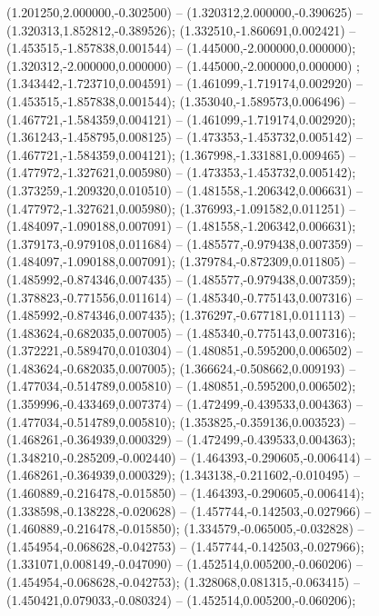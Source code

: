  (1.201250,2.000000,-0.302500) -- (1.320312,2.000000,-0.390625) -- (1.320313,1.852812,-0.389526);
 (1.332510,-1.860691,0.002421) -- (1.453515,-1.857838,0.001544) -- (1.445000,-2.000000,0.000000);
 (1.320312,-2.000000,0.000000) -- (1.445000,-2.000000,0.000000) ;
 (1.343442,-1.723710,0.004591) -- (1.461099,-1.719174,0.002920) -- (1.453515,-1.857838,0.001544);
 (1.353040,-1.589573,0.006496) -- (1.467721,-1.584359,0.004121) -- (1.461099,-1.719174,0.002920);
 (1.361243,-1.458795,0.008125) -- (1.473353,-1.453732,0.005142) -- (1.467721,-1.584359,0.004121);
 (1.367998,-1.331881,0.009465) -- (1.477972,-1.327621,0.005980) -- (1.473353,-1.453732,0.005142);
 (1.373259,-1.209320,0.010510) -- (1.481558,-1.206342,0.006631) -- (1.477972,-1.327621,0.005980);
 (1.376993,-1.091582,0.011251) -- (1.484097,-1.090188,0.007091) -- (1.481558,-1.206342,0.006631);
 (1.379173,-0.979108,0.011684) -- (1.485577,-0.979438,0.007359) -- (1.484097,-1.090188,0.007091);
 (1.379784,-0.872309,0.011805) -- (1.485992,-0.874346,0.007435) -- (1.485577,-0.979438,0.007359);
 (1.378823,-0.771556,0.011614) -- (1.485340,-0.775143,0.007316) -- (1.485992,-0.874346,0.007435);
 (1.376297,-0.677181,0.011113) -- (1.483624,-0.682035,0.007005) -- (1.485340,-0.775143,0.007316);
 (1.372221,-0.589470,0.010304) -- (1.480851,-0.595200,0.006502) -- (1.483624,-0.682035,0.007005);
 (1.366624,-0.508662,0.009193) -- (1.477034,-0.514789,0.005810) -- (1.480851,-0.595200,0.006502);
 (1.359996,-0.433469,0.007374) -- (1.472499,-0.439533,0.004363) -- (1.477034,-0.514789,0.005810);
 (1.353825,-0.359136,0.003523) -- (1.468261,-0.364939,0.000329) -- (1.472499,-0.439533,0.004363);
 (1.348210,-0.285209,-0.002440) -- (1.464393,-0.290605,-0.006414) -- (1.468261,-0.364939,0.000329);
 (1.343138,-0.211602,-0.010495) -- (1.460889,-0.216478,-0.015850) -- (1.464393,-0.290605,-0.006414);
 (1.338598,-0.138228,-0.020628) -- (1.457744,-0.142503,-0.027966) -- (1.460889,-0.216478,-0.015850);
 (1.334579,-0.065005,-0.032828) -- (1.454954,-0.068628,-0.042753) -- (1.457744,-0.142503,-0.027966);
 (1.331071,0.008149,-0.047090) -- (1.452514,0.005200,-0.060206) -- (1.454954,-0.068628,-0.042753);
 (1.328068,0.081315,-0.063415) -- (1.450421,0.079033,-0.080324) -- (1.452514,0.005200,-0.060206);
